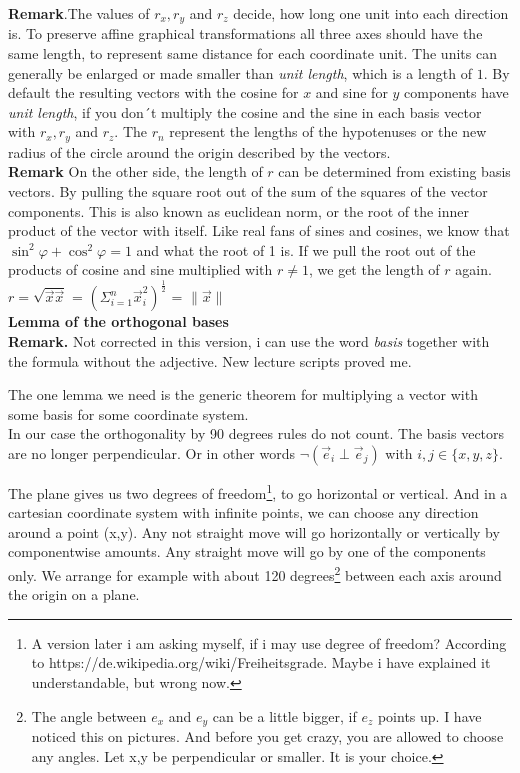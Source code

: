 \documentclass[a4paper]{article}
\begin{document}
\textbf{Remark}.The values of $r_x, r_y$ and $r_z$ decide, how long one unit into each
direction is. To preserve affine graphical transformations all three
axes should have the same length, to represent same distance for each coordinate unit. 
The units can generally be enlarged or made smaller than \emph{unit length}, which is a length of $1$. 
By default the resulting vectors with the cosine for $x$ and sine for $y$ components have \emph{unit length}, 
if you don´t multiply the cosine and the sine in each basis vector with $r_x, r_y$ and $r_z$. The $r_n$ represent the lengths of the hypotenuses or the new radius of the circle around the origin described by the vectors. \\

\textbf{Remark} On the other side, the length of $r$ can be determined from existing basis vectors.
By pulling the square root out of the sum of the squares of the vector components.
This is also known as euclidean norm, or the root of the inner product of the vector with itself.
Like real fans of sines and cosines, we know that $\sin^2 \varphi + \cos^2 \varphi = 1$ and what the root of 1 is.
If we pull the root out of the products of cosine and sine multiplied with $r \ne 1$, we get the length of $r$ again. 
$r = \sqrt{\vec{x}\vec{x}}$ = $\left(\Sigma_{i=1}^{n} \vec{x}_i^2\right)^{\frac{1}{2}}$ = $\|\vec{x}\|$\\

\textbf{Lemma of the orthogonal bases}\\

\textbf{Remark.} Not corrected in this version, i can use the word \emph{basis} together with the formula without the adjective. New lecture scripts proved me.

The one lemma we need is the generic theorem for multiplying a vector with some basis for some coordinate system.\\

In our case the orthogonality by 90 degrees rules do not count. The basis vectors are no longer perpendicular. Or in other words
$\neg \left( \vec{e}_i \perp \vec{e}_j \right)$ with $i,j \in \{x,y,z\}.$

The plane gives us two degrees of freedom\footnote{A version later i am asking myself, if i may use degree of freedom? According to https://de.wikipedia.org/wiki/Freiheitsgrade. Maybe i have explained it understandable, but wrong now.}, to go horizontal or vertical. And in a cartesian coordinate system with infinite points, we can choose any direction around a point (x,y).
Any not straight move will go horizontally or vertically by componentwise amounts. Any straight move will go by one of the components only.
We arrange for example with about 120 degrees\footnote{The angle between $e_x$ and $e_y$ can be a little bigger, if $e_z$ points up. I have noticed this on pictures. And before you get crazy, you are allowed to choose any angles. Let x,y be perpendicular or smaller. It is your choice.} between each axis around the origin on a plane. \\
\end{document}
